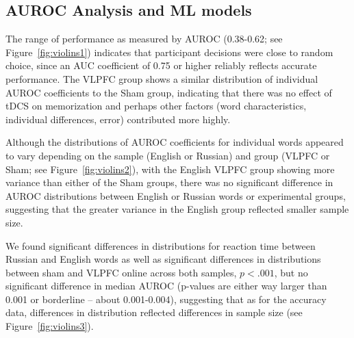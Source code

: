 \documentclass[10pt,letterpaper]{article}
\begin{document}
\subsection{AUROC Analysis and ML models}

The range of performance as measured by AUROC (0.38-0.62; see Figure~\ref{fig:violins1}) indicates that participant decisions were close to random choice, since an AUC coefficient of 0.75 or higher reliably reflects accurate performance. The VLPFC group shows a similar distribution of individual AUROC coefficients to the Sham group, indicating that there was no effect of tDCS on memorization and perhaps other factors (word characteristics, individual differences, error) contributed more highly. 

\begin{center}
\label{fig:violins1}
\end{center}

Although the distributions of AUROC coefficients for individual words appeared to vary depending on the sample (English or Russian) and group (VLPFC or Sham; see Figure~\ref{fig:violins2}), with the English VLPFC group showing more variance than either of the Sham groups, there was no significant difference in AUROC distributions between English or Russian words or experimental groups, suggesting that the greater variance in the English group reflected smaller sample size. 



\begin{center}
\label{fig:violins2}
\end{center}

We found significant differences in distributions for reaction time between Russian and English words as well as significant differences in distributions between sham and VLPFC online across both samples, \(p<.001\), but no significant difference in median AUROC (p-values are either way larger than 0.001 or borderline – about 0.001-0.004), suggesting that as for the accuracy data, differences in distribution reflected differences in sample size (see Figure~\ref{fig:violins3}). 
\end{document}
